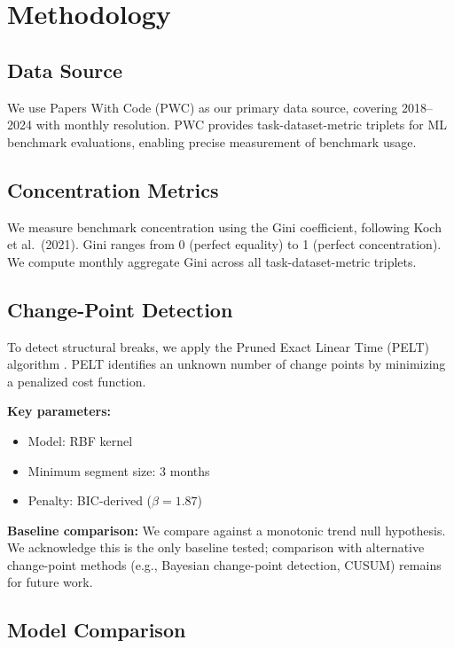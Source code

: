 \section{Methodology}
\label{sec:methodology}

\subsection{Data Source}

We use Papers With Code (PWC) as our primary data source, covering 2018--2024 with monthly resolution. PWC provides task-dataset-metric triplets for ML benchmark evaluations, enabling precise measurement of benchmark usage.

\subsection{Concentration Metrics}

We measure benchmark concentration using the Gini coefficient, following Koch et al.\ (2021). Gini ranges from 0 (perfect equality) to 1 (perfect concentration). We compute monthly aggregate Gini across all task-dataset-metric triplets.

\subsection{Change-Point Detection}

To detect structural breaks, we apply the Pruned Exact Linear Time (PELT) algorithm \cite{killick2012optimal}. PELT identifies an unknown number of change points by minimizing a penalized cost function.

\textbf{Key parameters:}
\begin{itemize}
    \item Model: RBF kernel
    \item Minimum segment size: 3 months
    \item Penalty: BIC-derived ($\beta = 1.87$)
\end{itemize}

\textbf{Baseline comparison:} We compare against a monotonic trend null hypothesis. We acknowledge this is the only baseline tested; comparison with alternative change-point methods (e.g., Bayesian change-point detection, CUSUM) remains for future work.

\subsection{Model Comparison}

